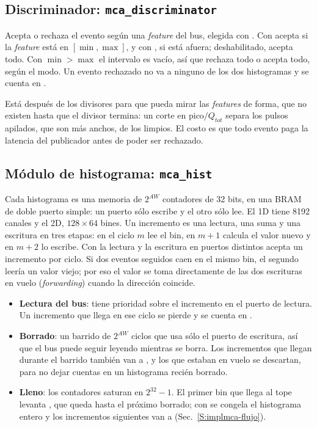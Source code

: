 \subsection{Discriminador:
\texorpdfstring{\texttt{mca\_discriminator}}{mca\_discriminator}}
\label{S:implmca-discr}

Acepta o rechaza el evento según una \emph{feature} del bus, elegida con
. Con  acepta si la \emph{feature}
está en $[\min, \max]$, y con , si está afuera;
deshabilitado, acepta todo. Con $\min > \max$ el intervalo es vacío, así que
rechaza todo o acepta todo, según el modo. Un evento rechazado no va a ninguno
de los dos histogramas y se cuenta en .

Está después de los divisores para que pueda mirar las \emph{features} de forma, que no
existen hasta que el divisor termina: un corte en $\text{pico}/Q_{tot}$ separa
los pulsos apilados, que son más anchos, de los limpios. El costo es que todo
evento paga la latencia del publicador antes de poder ser rechazado.

\subsection{Módulo de histograma:
\texorpdfstring{\texttt{mca\_hist}}{mca\_hist}}
\label{S:implmca-hist}

Cada histograma es una memoria de $2^{AW}$ contadores de 32 bits, en una BRAM de
doble puerto simple: un puerto sólo escribe y el otro sólo lee. El 1D tiene 8192
canales y el 2D, $128 \times 64$ bines. Un incremento es una lectura, una suma y
una escritura en tres etapas: en el ciclo $m$ lee el bin, en $m+1$ calcula el
valor nuevo y en $m+2$ lo escribe. Con la lectura y la escritura en puertos
distintos acepta un incremento por ciclo. Si dos eventos seguidos caen en el
mismo bin, el segundo leería un valor viejo; por eso el valor se toma
directamente de las dos escrituras en vuelo (\emph{forwarding}) cuando la
dirección coincide.
\begin{itemize}
  \item \textbf{Lectura del bus}: tiene prioridad sobre el incremento en el
    puerto de lectura. Un incremento que llega en ese ciclo se pierde y se
    cuenta en .
  \item \textbf{Borrado}: un barrido de $2^{AW}$ ciclos que usa sólo el puerto
    de escritura, así que el bus puede seguir leyendo mientras se borra. Los
    incrementos que llegan durante el barrido también van a , y
    los que estaban en vuelo se descartan, para no dejar cuentas en un
    histograma recién borrado.
  \item \textbf{Lleno}: los contadores saturan en $2^{32} - 1$. El primer bin
    que llega al tope levanta , que queda hasta el próximo borrado;
    con  se congela el histograma entero y los
    incrementos siguientes van a 
    (Sec.~\ref{S:implmca-flujo}).
\end{itemize}

\bibliografiacapitulo

